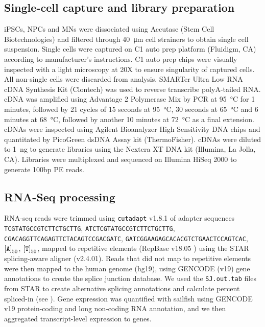 \subsection{Single-cell capture and library preparation}

iPSCs, NPCs and MNs were dissociated using Accutase (Stem Cell\\Biotechnologies) and filtered through \SI{40}{\micro\meter} cell strainers to obtain single cell suspension. Single cells were captured on C1 auto prep platform (Fluidigm, CA) according to manufacturer's instructions. C1 auto prep chips were visually inspected with a light microscopy at 20X to ensure singularity of captured cells. All non-single cells were discarded from analysis. SMARTer Ultra Low RNA cDNA Synthesis Kit (Clontech) was used to reverse transcribe polyA-tailed RNA. cDNA was amplified using Advantage 2 Polymerase Mix by PCR at \SI{95}{\degreeCelsius} for 1 minutes, followed by 21 cycles of 15 seconds at \SI{95}{\degreeCelsius}, 30 seconds at \SI{65}{\degreeCelsius} and 6 minutes at \SI{68}{\degreeCelsius}, followed by another 10 minutes at \SI{72}{\degreeCelsius} as a final extension. cDNAs were inspected using Agilent Bioanalyzer High Sensitivity DNA chips and quantitated by PicoGreen dsDNA Assay kit (ThermoFisher). cDNAs were diluted to \SI{1}{\nano\gram} to generate libraries using the Nextera XT DNA kit (Illumina, La Jolla, CA). Libraries were multiplexed and sequenced on Illumina HiSeq 2000 to generate 100bp PE reads.

\subsection{RNA-Seq processing}

RNA-seq reads were trimmed using \texttt{cutadapt} v1.8.1 of adapter sequences \texttt{TCGTATGCCGTCTTCTGCTTG}, \texttt{ATCTCGTATGCCGTCTTCTGCTTG}, \\\texttt{CGACAGGTTCAGAGTTCTACAGTCCGACGATC}, \texttt{GATCGGAAGAGCACACGTCTGAACTCCAGTCAC}, $\left[\text{\texttt{A}}\right]_{50}$, $\left[\text{\texttt{T}}\right]_{50}$, mapped to repetitive elements (RepBase v18.05 \cite{Jurka:2005tp}) using the STAR\cite{Dobin:2013fg} splicing-aware aligner (v2.4.01). Reads that did not map to repetitive elements were then mapped to the human genome (hg19), using GENCODE\cite{Harrow:2012cx} (v19) gene annotations to create the splice junction database. We used the  \texttt{SJ.out.tab} files from STAR to create alternative splicing annotations and calculate percent spliced-in (see ). Gene expression was quantified with sailfish \cite{Patro:2014jd} using GENCODE v19 protein-coding and long non-coding RNA annotation, and we then aggregated transcript-level expression to genes.

